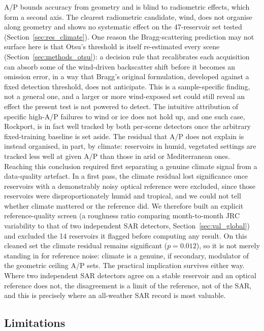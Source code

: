 A/P bounds accuracy from geometry and is blind to radiometric effects, which
form a second axis. The clearest radiometric candidate, wind, does not organise
along geometry and shows no systematic effect on the 47-reservoir set tested
(Section~\ref{sec:res_climate}). One reason the Bragg-scattering prediction
\citep{Valenzuela1978} may not surface here is that Otsu's threshold is
itself re-estimated every scene (Section~\ref{sec:methods_otsu}): a decision
rule that recalibrates each acquisition can absorb some of the wind-driven
backscatter shift before it becomes an omission error, in a way that Bragg's
original formulation, developed against a fixed detection threshold, does not
anticipate. This is a sample-specific finding, not a general one, and a
larger or more wind-exposed set could still reveal an effect the present test
is not powered to detect. The intuitive attribution of specific
high-A/P failures to wind or ice does not hold up, and one such case, Rockport,
is in fact well tracked by both per-scene detectors once the arbitrary
fixed-training baseline is set aside. The residual that A/P does not explain is
instead organised, in part, by climate: reservoirs in humid, vegetated settings
are tracked less well at given A/P than those in arid or Mediterranean ones.
Reaching this conclusion required first separating a genuine climate signal
from a data-quality artefact. In a first pass, the climate residual lost
significance once reservoirs with a demonstrably noisy optical reference were
excluded, since those reservoirs were disproportionately humid and tropical,
and we could not tell whether climate mattered or the reference did. We
therefore built an explicit reference-quality screen (a roughness ratio
comparing month-to-month JRC variability to that of two independent SAR
detectors, Section~\ref{sec:val_global}) and excluded the 14 reservoirs it
flagged before
computing any result. On this cleaned set the climate residual remains
significant ($p=0.012$), so it is not merely standing in for reference noise:
climate is a genuine, if secondary, modulator of the geometric ceiling A/P
sets. The practical implication survives either way. Where two independent
SAR detectors agree on a stable reservoir and an optical reference does not,
the disagreement is a limit of the reference, not of the SAR, and this is
precisely where an all-weather SAR record is most valuable.

\subsection{Limitations}
\label{sec:disc_limitations}

